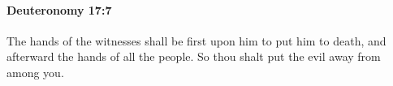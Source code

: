 
		\paragraph{Deuteronomy 17:7} %
			\label{DEUTERONOMY-17-7}

			The hands of the witnesses shall be first upon him to put him to death, and afterward the hands of all the people. So thou shalt put the evil away from among you.


